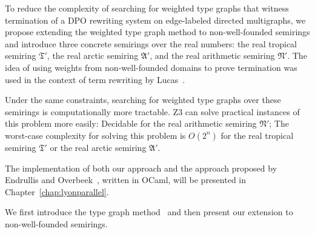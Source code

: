 To reduce the complexity of searching for weighted type graphs that witness termination of a DPO rewriting system on edge-labeled directed multigraphs, we propose extending the weighted type graph method to non-well-founded semirings and introduce three concrete semirings over the real numbers: the real tropical semiring $\mathfrak{T}'$, the real arctic semiring $\mathfrak{A}'$, and the real arithmetic semiring $\mathfrak{N}'$. The idea of using weights from non-well-founded domains to prove termination was used in the context of term rewriting by Lucas~\cite{lucas2006relative}.

Under the same constraints, searching for weighted type graphs over these semirings is computationally more tractable.
Z3 can solve practical instances of this problem more easily: Decidable for the real arithmetic semiring $\mathfrak{N}'$;
The worst-case complexity for solving this problem is $O(2^n)$ for the real tropical semiring $\mathfrak{T}'$ or the real arctic semiring $\mathfrak{A}'$.

The implementation of both our approach and the approach proposed by Endrullis and Overbeek~\cite{endrullis2024generalized_icgt}, written in OCaml, will be presented in Chapter~\ref{chap:lyonparallel}.

We first introduce the type graph method~\cite{endrullis2024generalized_icgt} and then present our extension to non-well-founded semirings.